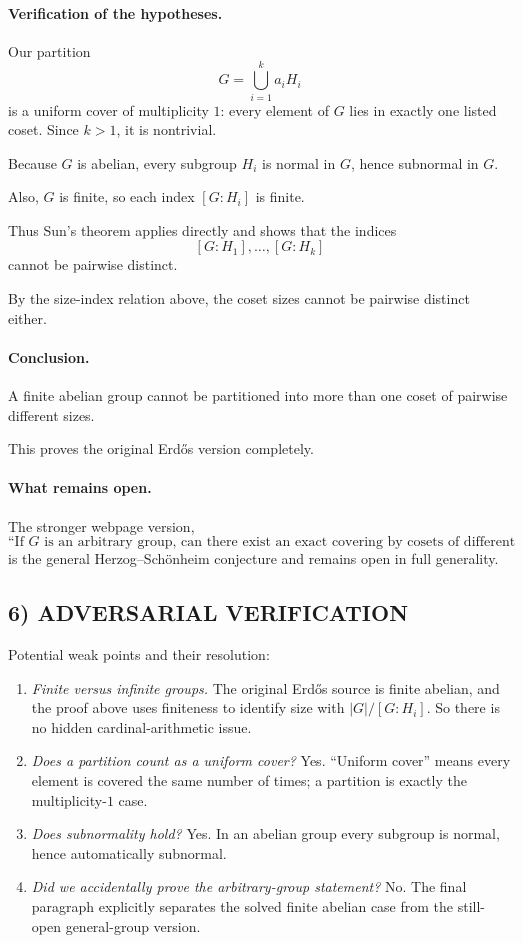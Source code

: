 \paragraph{Verification of the hypotheses.}
Our partition
\[
G=\bigcup_{i=1}^k a_iH_i
\]
is a uniform cover of multiplicity $1$: every element of $G$ lies in exactly one listed coset.  Since $k>1$, it is nontrivial.

Because $G$ is abelian, every subgroup $H_i$ is normal in $G$, hence subnormal in $G$.

Also, $G$ is finite, so each index $[G:H_i]$ is finite.

Thus Sun's theorem applies directly and shows that the indices
\[
[G:H_1],\dots,[G:H_k]
\]
cannot be pairwise distinct.

By the size-index relation above, the coset sizes cannot be pairwise distinct either.

\paragraph{Conclusion.}
A finite abelian group cannot be partitioned into more than one coset of pairwise different sizes.

This proves the original Erd\H{o}s version completely.

\paragraph{What remains open.}
The stronger webpage version,
\[
\mbox{``If $G$ is an arbitrary group, can there exist an exact covering by cosets of different sizes?''}
\]
is the general Herzog--Sch\"onheim conjecture and remains open in full generality.

\subsection*{6) ADVERSARIAL VERIFICATION}

Potential weak points and their resolution:

\begin{enumerate}
\item \emph{Finite versus infinite groups.}  
The original Erd\H{o}s source is finite abelian, and the proof above uses finiteness to identify size with $|G|/[G:H_i]$.  So there is no hidden cardinal-arithmetic issue.
\item \emph{Does a partition count as a uniform cover?}  
Yes.  ``Uniform cover'' means every element is covered the same number of times; a partition is exactly the multiplicity-$1$ case.
\item \emph{Does subnormality hold?}  
Yes.  In an abelian group every subgroup is normal, hence automatically subnormal.
\item \emph{Did we accidentally prove the arbitrary-group statement?}  
No.  The final paragraph explicitly separates the solved finite abelian case from the still-open general-group version.
\end{enumerate}

